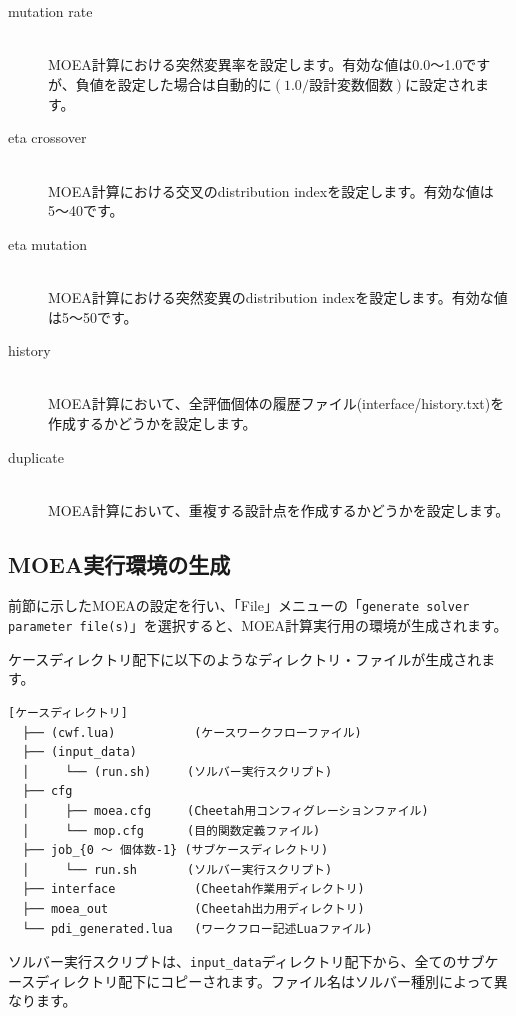 \documentclass[a4paper,11pt]{jarticle}
\begin{document}
{\begin{description}
\item[mutation rate] {\ }\\
MOEA計算における突然変異率を設定します。有効な値は0.0〜1.0ですが、負値を設定した場合は自動的に$(1.0 / 設計変数個数)$に設定されます。

\item[eta crossover] {\ }\\
MOEA計算における交叉のdistribution indexを設定します。有効な値は5〜40です。

\item[eta mutation] {\ }\\
MOEA計算における突然変異のdistribution indexを設定します。有効な値は5〜50です。

\item[history] {\ }\\
MOEA計算において、全評価個体の履歴ファイル(interface/history.txt)を作成するかどうかを設定します。

\item[duplicate] {\ }\\
MOEA計算において、重複する設計点を作成するかどうかを設定します。



\end{description}


\subsection{MOEA実行環境の生成}

前節に示したMOEAの設定を行い、「File」メニューの「{\tt generate solver parameter file(s)}」を選択すると、MOEA計算実行用の環境が生成されます。

ケースディレクトリ配下に以下のようなディレクトリ・ファイルが生成されます。

\begin{verbatim}
[ケースディレクトリ]
  ├── (cwf.lua)           (ケースワークフローファイル)
  ├── (input_data)
  │     └── (run.sh)     (ソルバー実行スクリプト)
  ├── cfg
  │     ├── moea.cfg     (Cheetah用コンフィグレーションファイル)
  │     └── mop.cfg      (目的関数定義ファイル)
  ├── job_{0 〜 個体数-1} (サブケースディレクトリ)
  │     └── run.sh       (ソルバー実行スクリプト)
  ├── interface           (Cheetah作業用ディレクトリ)
  ├── moea_out            (Cheetah出力用ディレクトリ)
  └── pdi_generated.lua   (ワークフロー記述Luaファイル)
\end{verbatim}

ソルバー実行スクリプトは、{\tt input\_data}ディレクトリ配下から、全てのサブケースディレクトリ配下にコピーされます。ファイル名はソルバー種別によって異なります。

}
\end{document}
